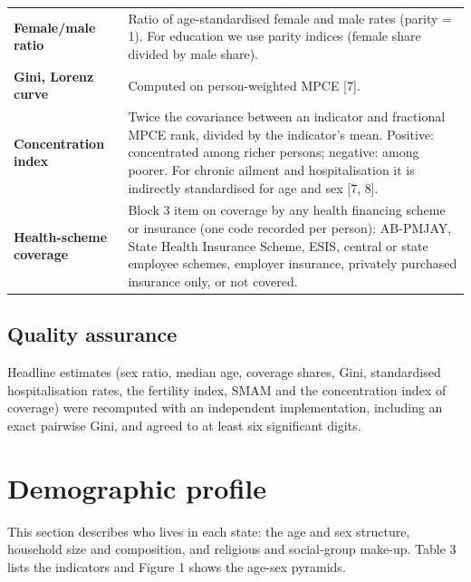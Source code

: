 \documentclass[10pt,a4paper]{article}
\begin{document}
\begin{table}[!htb]
\begin{tabular}{>{\raggedright\arraybackslash}p{3.42cm}>{\raggedright\arraybackslash}p{13.02cm}}
\textbf{Female/male ratio} & Ratio of age-standardised female and male rates (parity = 1). For education we use parity indices (female share divided by male share). \\
\textbf{Gini, Lorenz curve} & Computed on person-weighted MPCE [7]. \\
\textbf{Concentration index} & Twice the covariance between an indicator and fractional MPCE rank, divided by the indicator's mean. Positive: concentrated among richer persons; negative: among poorer. For chronic ailment and hospitalisation it is indirectly standardised for age and sex [7, 8]. \\
\textbf{Health-scheme coverage} & Block 3 item on coverage by any health financing scheme or insurance (one code recorded per person): AB-PMJAY, State Health Insurance Scheme, ESIS, central or state employee schemes, employer insurance, privately purchased insurance only, or not covered. \\
\bottomrule
\end{tabular}
\end{table}

\subsection{Quality assurance}

Headline estimates (sex ratio, median age, coverage shares, Gini, standardised hospitalisation rates, the fertility index, SMAM and the concentration index of coverage) were recomputed with an independent implementation, including an exact pairwise Gini, and agreed to at least six significant digits.

\newpage
\section{Demographic profile}

This section describes who lives in each state: the age and sex structure, household size and composition, and religious and social-group make-up. Table 3 lists the indicators and Figure 1 shows the age-sex pyramids.
\end{document}
